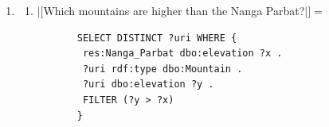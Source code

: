 \documentclass[11pt]{article}
\begin{document}
\begin{enumerate}
\item \begin{enumerate}
 \item $|[$Which mountains are higher than the Nanga Parbat?$|]=$
       \begin{small}\begin{verbatim}
       SELECT DISTINCT ?uri WHERE { 
        res:Nanga_Parbat dbo:elevation ?x .
        ?uri rdf:type dbo:Mountain .
        ?uri dbo:elevation ?y . 
        FILTER (?y > ?x) 
       }
       \end{verbatim}\end{small} 
\end{enumerate}
\end{enumerate}
\end{document}
